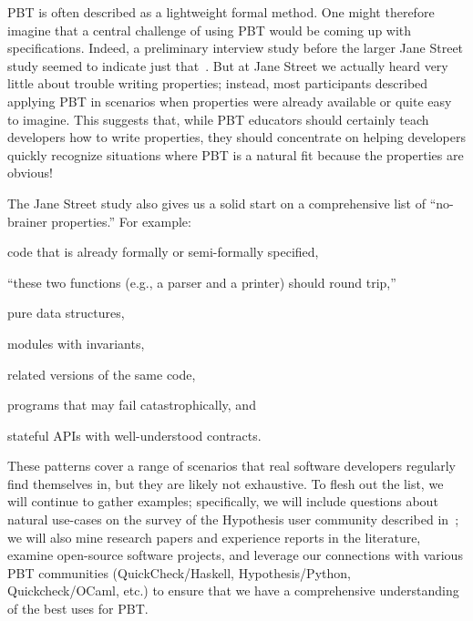 \ifdraft
{}
\fi

PBT is often described as a lightweight formal method.  One
might therefore imagine that a central challenge of using PBT would be
coming up with specifications. Indeed, a preliminary interview
study before the larger Jane Street study seemed to indicate just
that~\cite{ref:goldstein2022some}. But at
Jane Street we actually heard very little about trouble
writing
properties; instead, most participants described applying PBT in scenarios when
properties were already available or quite easy to imagine. This suggests that,
while PBT educators should certainly teach developers how to
write properties, they should concentrate on
helping developers quickly recognize situations where PBT is a
natural fit because the properties are obvious!

The Jane Street study also gives us a solid start on a comprehensive list of
``no-brainer properties.''  For example:
\begin{enumerate*}[label=(1)]
\item code that is already formally or semi-formally specified,
\item ``these two functions (e.g., a parser and a printer) should
round trip,'' 
\item pure data structures,
\item modules with invariants,
\item related versions of the same code,
\item programs that may fail catastrophically,
and
\item stateful APIs with well-understood contracts.
\end{enumerate*}
These patterns cover a range of
scenarios that real software developers regularly find themselves in, but they
are likely not exhaustive. To flesh out the list, we will continue to
gather examples; specifically, we will include
questions about natural use-cases on the survey of the Hypothesis user
community described in~; we will also mine
research papers and experience reports in the literature,
examine open-source software projects, and leverage our connections with various
PBT communities (QuickCheck/Haskell, Hypothesis/Python, Quickcheck/OCaml, etc.)
to ensure that we have a comprehensive understanding of the best uses for PBT.

